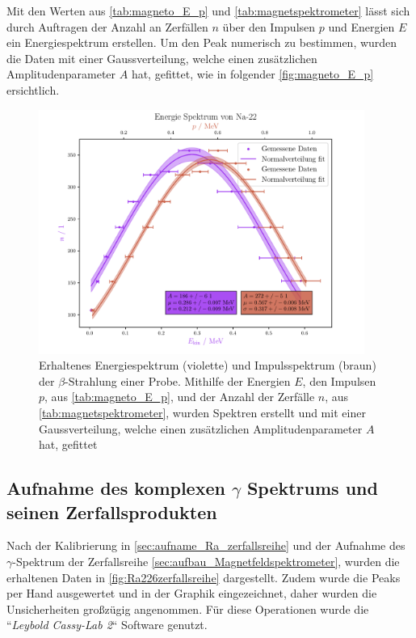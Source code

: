 \documentclass[12pt,english,ngerman]{scrartcl}
\begin{document}
Mit den Werten aus \autoref{tab:magneto_E_p} und
\autoref{tab:magnetspektrometer} lässt sich durch Auftragen der Anzahl an
Zerfällen $n$ über den Impulsen $p$ und Energien $E$ ein Energiespektrum
erstellen. Um den Peak numerisch zu bestimmen, wurden die Daten mit einer
Gaussverteilung, welche einen zusätzlichen Amplitudenparameter $A$ hat,
gefittet, wie in folgender \autoref{fig:magneto_E_p} ersichtlich.

\begin{figure}[H]
	\begin{center}
		\includegraphics[width = 0.95\textwidth]{figures/energiespektrum.pdf}
	\end{center}
	\caption[Energie- und Impulsspektogram der $\beta$-Strahlung einer
		 Probe]{Erhaltenes Energiespektrum (violette) und
		Impulsspektrum (braun) der $\beta$-Strahlung einer  Probe.
		Mithilfe der Energien $E$, den Impulsen $p$, aus
		\autoref{tab:magneto_E_p}, und der Anzahl der Zerfälle $n$, aus
		\autoref{tab:magnetspektrometer}, wurden Spektren erstellt und mit einer
		Gaussverteilung, welche einen zusätzlichen Amplitudenparameter $A$ hat,
		gefittet}\label{fig:magneto_E_p}
\end{figure}

\subsection{Aufnahme des komplexen \texorpdfstring{$\gamma$}{gamma} Spektrums
	und seinen Zerfallsprodukten}

Nach der Kalibrierung in \autoref{sec:aufname_Ra_zerfallsreihe} und der
Aufnahme des \(\gamma\)-Spektrum der  Zerfallsreihe
\autoref{sec:aufbau_Magnetfeldspektrometer}, wurden die erhaltenen Daten in
\autoref{fig:Ra226zerfallsreihe} dargestellt. Zudem wurde die Peaks per Hand
ausgewertet und in der Graphik eingezeichnet, daher wurden die Unsicherheiten
großzügig angenommen. Für diese Operationen wurde die ``\emph{Leybold Cassy-Lab
	2}`` Software genutzt.
\end{document}
